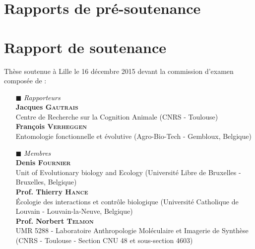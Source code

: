 \documentclass[a4paper,11pt,fleqn]{book} %
\begin{document}




\chapter{Rapports de pré-soutenance}


\chapter{Rapport de soutenance}

Thèse soutenue à Lille le 16 décembre 2015 devant la commission d'examen composée de :
\begin{itemize} 
\item[\tiny{$\blacksquare$}] \textit{Rapporteurs} \\
\textbf{Jacques \textsc{Gautrais}}\\ Centre de Recherche sur la Cognition Animale (CNRS - Toulouse)\\
\textbf{François \textsc{Verheggen}}\\ Entomologie fonctionnelle et évolutive (Agro-Bio-Tech - Gembloux, Belgique)\\
\end{itemize}

\begin{itemize} 
\item[\tiny{$\blacksquare$}] \textit{Membres} \\
\textbf{Denis \textsc{Fournier}}\\ Unit of Evolutionary biology and Ecology (Université Libre de Bruxelles - Bruxelles, Belgique)\\
\textbf{Prof. Thierry \textsc{Hance}}\\ Écologie des interactions et contrôle biologique (Université Catholique de Louvain - Louvain-la-Neuve, Belgique)\\
\textbf{Prof. Norbert \textsc{Telmon}}\\ UMR 5288 - Laboratoire Anthropologie Moléculaire et Imagerie de Synthèse (CNRS - Toulouse - Section CNU 48 et sous-section 4603)\\
\end{itemize}
\end{document}
